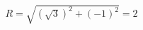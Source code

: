 \documentclass[preview]{standalone}
\begin{document}
\begin{align*}
R=\sqrt{(\sqrt{3})^2+(-1)^2}=2
\end{align*}
\end{document}
